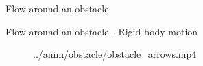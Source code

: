 \documentclass{beamer}  %
\begin{document}
\begin{frame}{Flow around an obstacle}
    \begin{figure}
        \begin{overprint}
        \end{overprint}
    \end{figure}
\end{frame}

\begin{frame}{Flow around an obstacle - Rigid body motion}
    \begin{figure}
        \centering
        \movie[width=0.725\textheight, height=0.75\textheight, autostart, loop]{} {../anim/obstacle/obstacle_arrows.mp4}
    \end{figure}
\end{frame}

\end{document}
